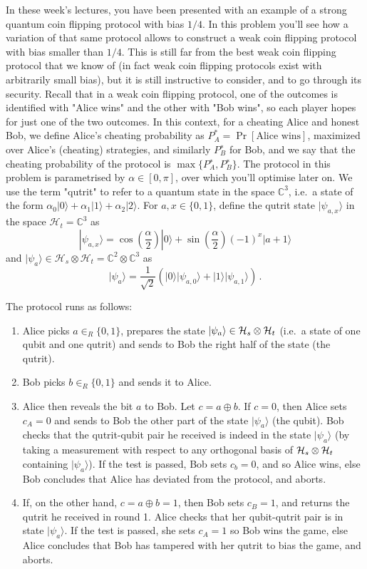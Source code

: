 \documentclass[a4paper,10pt,landscape,twocolumn]{scrartcl}
\newcommand{\ket}[1]{| #1 \rangle}
\begin{document}
\begin{exercise}
In these week's lectures, you have been presented with an example of a strong quantum coin flipping protocol with bias $1/4$. In this problem you'll see how a variation of that same protocol allows to construct a weak coin flipping protocol with bias smaller than $1/4$. This is still far from the best weak coin flipping protocol that we know of (in fact weak coin flipping protocols exist with arbitrarily small bias), but it is still instructive to consider, and to go through its security. 
Recall that in a weak coin flipping protocol, one of the outcomes is identified with "Alice wins" and the other with "Bob wins", so each player hopes for just one of the two outcomes. In this context, for a cheating Alice and honest Bob, we define Alice's cheating probability as $P_A^*=\Pr[\text{Alice wins}]$, maximized over Alice's (cheating) strategies, and similarly $P_B^∗$ for Bob, and we say that the cheating probability of the protocol is $\max\{P_A^∗,P_B^∗\}$. The protocol in this problem is parametrised by $\alpha \in [0,\pi]$, over which you'll optimise later on. 
We use the term "qutrit" to refer to a quantum state in the space $\mathbb{C}^3$, i.e.\ a state of the form $\alpha_0\ket{0}+\alpha_1\ket{1} + \alpha_2 \ket{2}$. For $a,x \in \{0,1\}$, define the qutrit state $\ket{\psi_{a,x}}$ in the space $\mathcal{H}_t = \mathbb{C}^3$ as
\[
\ket{\psi_{a,x}} = \cos(\frac{\alpha}{2}) \ket{0} + \sin(\frac{\alpha}{2}) (-1)^x \ket{a+1}
\]
and $\ket{\psi_a} \in \mathcal{H}_s \otimes \mathcal{H}_t = \mathbb{C}^2 \otimes \mathbb{C}^3$ as 
\[
\ket{\psi_a} = \frac{1}{\sqrt{2}} ( \ket{0} \ket{\psi_{a,0}} + \ket{1} \ket{\psi_{a,1}} ) \, .
\]

The protocol runs as follows:
\begin{enumerate}
\item Alice picks $a \in_R \{0,1\}$, prepares the state $\ket{\psi_a} \in \mathcal{H}_s \otimes \Hi_t$ (i.e.\ a state of one qubit and one qutrit) and sends to Bob the right half of the state (the qutrit).
\item Bob picks $b \in_R \{0,1\}$ and sends it to Alice.
\item Alice then reveals the bit $a$ to Bob. Let $c=a \oplus b$. If $c=0$, then Alice sets $c_A=0$ and sends to Bob the other part of the state $\ket{\psi_a}$ (the qubit). Bob checks that the qutrit-qubit pair he received is indeed in the state $\ket{\psi_a}$ (by taking a measurement with respect to any orthogonal basis of $\mathcal{H}_s \otimes \mathcal{H}_t$ containing $\ket{\psi_a}$). If the test is passed, Bob sets $c_b=0$, and so Alice wins, else Bob concludes that Alice has deviated from the protocol, and aborts.
\item If, on the other hand, $c=a \oplus b=1$, then Bob sets $c_B=1$, and returns the qutrit he received in round 1. Alice checks that her qubit-qutrit pair is in state $\ket{\psi_a}$. If the test is passed, she sets $c_A=1$ so Bob wins the game, else Alice concludes that Bob has tampered with her qutrit to bias the game, and aborts.
\end{enumerate}


\end{exercise}
\end{document}
